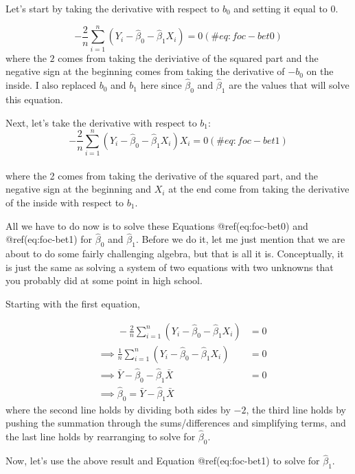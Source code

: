 \documentclass[
  letterpaper,
  DIV=11,
  numbers=noendperiod]{scrreprt}
\begin{document}
Let's start by taking the derivative with respect to \(b_0\) and setting
it equal to 0.

\[
  -\frac{2}{n}\sum_{i=1}^n (Y_i - \hat{\beta}_0 - \hat{\beta}_1 X_i) = 0 (\#eq:foc-bet0)
\] where the \(2\) comes from taking the deriviative of the squared part
and the negative sign at the beginning comes from taking the derivative
of \(-b_0\) on the inside. I also replaced \(b_0\) and \(b_1\) here
since \(\hat{\beta}_0\) and \(\hat{\beta}_1\) are the values that will
solve this equation.

Next, let's take the derivative with respect to \(b_1\): \[
  -\frac{2}{n} \sum_{i=1}^n (Y_i - \hat{\beta}_0 - \hat{\beta}_1 X_i) X_i = 0 (\#eq:foc-bet1)
\]\\
where the 2 comes from taking the derivative of the squared part, and
the negative sign at the beginning and \(X_i\) at the end come from
taking the derivative of the inside with respect to \(b_1\).

All we have to do now is to solve these Equations @ref(eq:foc-bet0) and
@ref(eq:foc-bet1) for \(\hat{\beta}_0\) and \(\hat{\beta}_1\). Before we
do it, let me just mention that we are about to do some fairly
challenging algebra, but that is all it is. Conceptually, it is just the
same as solving a system of two equations with two unknowns that you
probably did at some point in high school.

Starting with the first equation,

\[
  \begin{aligned}
  & \phantom{\implies} -\frac{2}{n} \sum_{i=1}^n (Y_i - \hat{\beta}_0 - \hat{\beta}_1 X_i) &= 0 \\
  & \implies \frac{1}{n} \sum_{i=1}^n (Y_i - \hat{\beta}_0 - \hat{\beta}_1 X_i) &= 0 \\
  & \implies \bar{Y} - \hat{\beta}_0 - \hat{\beta}_1 \bar{X} &= 0 \\
  & \implies \boxed{\hat{\beta}_0 = \bar{Y} - \hat{\beta}_1 \bar{X}} 
  \end{aligned} 
\] where the second line holds by dividing both sides by \(-2\), the
third line holds by pushing the summation through the sums/differences
and simplifying terms, and the last line holds by rearranging to solve
for \(\hat{\beta}_0\).

Now, let's use the above result and Equation @ref(eq:foc-bet1) to solve
for \(\hat{\beta}_1\).
\end{document}
